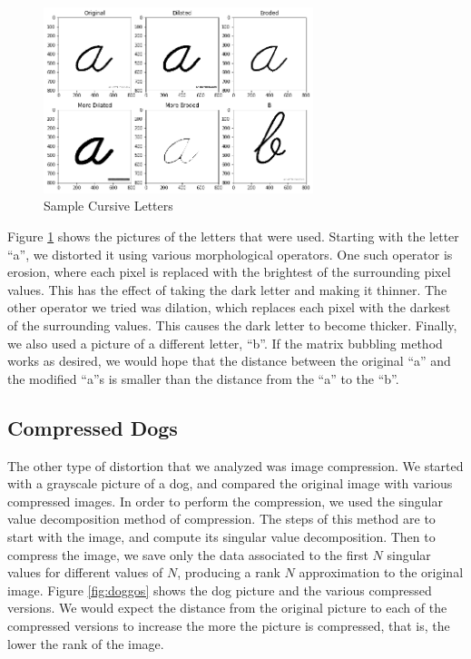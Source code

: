 \documentclass{article}
\begin{document}
\begin{figure}[h!]
\begin{center}
\includegraphics[width=0.7\textwidth]{a.png}
\caption{Sample Cursive Letters}
\label{fig:letters}
\end{center}
\end{figure}

Figure \ref{fig:letters} shows the pictures of the letters that were used. Starting with the letter ``a'', we distorted it using various morphological operators.\cite{morph}\cite{dilation} One such operator is erosion, where each pixel is replaced with the brightest of the surrounding pixel values. This has the effect of taking the dark letter and making it thinner. The other operator we tried was dilation, which replaces each pixel with the darkest of the surrounding values. This causes the dark letter to become thicker. Finally, we also used a picture of a different letter, ``b''. If the matrix bubbling method works as desired, we would hope that the distance between the original ``a'' and the modified ``a''s is smaller than the distance from the ``a'' to the ``b''.

\subsection{Compressed Dogs}

The other type of distortion that we analyzed was image compression. We started with a grayscale picture of a dog, and compared the original image with various compressed images. In order to perform the compression, we used the singular value decomposition method of compression. The steps of this method are to start with the image, and compute its singular value decomposition. Then to compress the image, we save only the data associated to the first $N$ singular values for different values of $N$, producing a rank $N$ approximation to the original image. Figure \ref{fig:doggos} shows the dog picture and the various compressed versions. We would expect the distance from the original picture to each of the compressed versions to increase the more the picture is compressed, that is, the lower the rank of the image.
\end{document}
